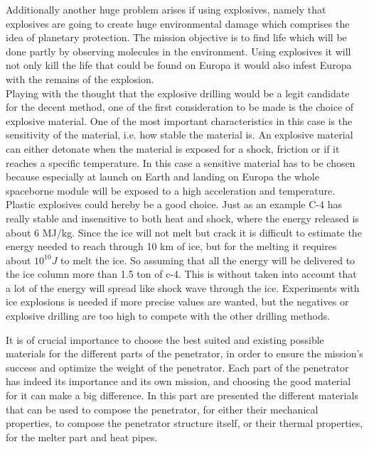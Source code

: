 \noindent
Additionally another huge problem arises if using explosives, namely that explosives are going to create huge environmental damage which comprises the idea of planetary protection. The mission objective is to find life which will be done partly by observing molecules in the environment. Using explosives it will not only kill the life that could be found on Europa it would also infest Europa with the remains of the explosion.\\

\noindent
Playing with the thought that the explosive drilling would be a legit candidate for the decent method, one of the first consideration to be made is the choice of explosive material. One of the most important characteristics in this case is the sensitivity of the material, i.e. how stable the material is. An explosive material can either detonate when the material is exposed for a shock, friction or if it reaches a specific temperature. In this case a sensitive material has to be chosen because especially at launch on Earth and landing on Europa the whole spaceborne module will be exposed to a high acceleration and temperature. Plastic explosives could hereby be a good choice. Just as an example C-4 has really stable and insensitive to both heat and shock, where the energy released is about 6 MJ/kg. Since the ice will not melt but crack it is difficult to estimate the energy needed to reach through 10 km of ice, but for the melting it requires about $10^{10}J$ to melt the ice. So assuming that all the energy will be delivered to the ice column more than 1.5 ton of c-4. This is without taken into account that a lot of the energy will spread like shock wave through the ice. Experiments with ice explosions is needed if more precise values are wanted, but the negatives or explosive drilling are too high to compete with the other drilling methods.










It is of crucial importance to choose the best suited and existing possible materials for the different parts of the penetrator, in order to ensure the mission's success and optimize the weight of the penetrator. Each part of the penetrator has indeed its importance and its own mission, and choosing the good material for it can make a big difference. In this part are presented the different materials that can be used to compose the penetrator, for either their mechanical properties, to compose the penetrator structure itself, or their thermal properties, for the melter part and heat pipes.

